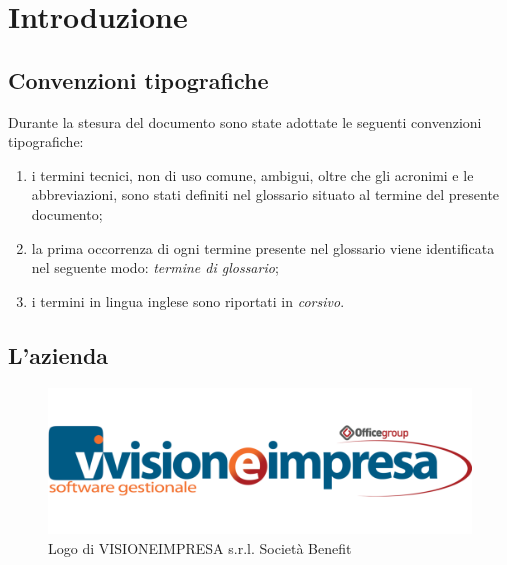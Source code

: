 \chapter{Introduzione}
\label{cap:introduzione}

\section{Convenzioni tipografiche}

Durante la stesura del documento sono state adottate le seguenti convenzioni tipografiche:
\begin{enumerate}
    \item i termini tecnici, non di uso comune, ambigui, oltre che gli acronimi e le abbreviazioni, sono stati definiti nel glossario situato al termine del presente documento;
    \item la prima occorrenza di ogni termine presente nel glossario viene identificata nel seguente modo: \emph{termine di glossario}\glsfirstoccur;
    \item i termini in lingua inglese sono riportati in \textit{corsivo}.
\end{enumerate}

\section{L'azienda}

\begin{figure}[!h]
    \centering 
    \includegraphics[width=0.6\columnwidth]{images/logo-visioneimpresa.png} 
    \caption{Logo di VISIONEIMPRESA s.r.l. Società Benefit}
\end{figure}

